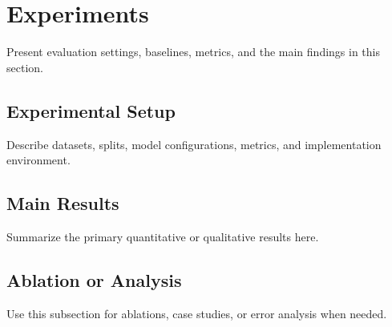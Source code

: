 \section{Experiments}

Present evaluation settings, baselines, metrics, and the main findings in this section.

\subsection{Experimental Setup}

Describe datasets, splits, model configurations, metrics, and implementation environment.

\subsection{Main Results}

Summarize the primary quantitative or qualitative results here.

\subsection{Ablation or Analysis}

Use this subsection for ablations, case studies, or error analysis when needed.
